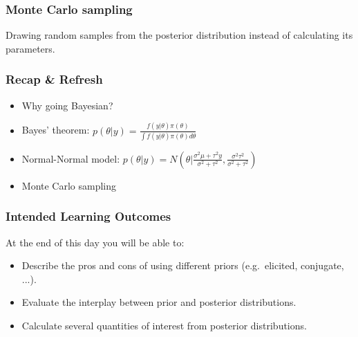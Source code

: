 \documentclass{beamer}
\newcommand{\1}{\ensuremath{\mathbf{1}}}
\begin{document}
%
%
%
\begin{frame}\frametitle{Monte Carlo sampling}
	Drawing random samples from the posterior distribution instead of calculating its parameters.
	\begin{center}
	\end{center}
\end{frame}
%
%
%
\begin{frame}\frametitle{Recap \& Refresh}
	\begin{itemize}
		\item Why going Bayesian? %
		\item Bayes' theorem: $p(\theta|y) = \frac{f(y|\theta)\pi(\theta)}{\int f(y|\theta)\pi(\theta)d\theta}$
		\item Normal-Normal model: $p(\theta|y) = N( \theta | \frac{\sigma^2\mu + \tau^2 y}{\sigma^2 + \tau^2}, \frac{\sigma^2\tau^2}{\sigma^2 + \tau^2})$
		\item Monte Carlo sampling
	\end{itemize}
\end{frame}
%
%
%
\begin{frame}\frametitle{Intended Learning Outcomes}
	At the end of this day you will be able to:
	\begin{itemize}
		\item Describe the pros and cons of using different priors (e.g.\ elicited, conjugate, ...).
		\item Evaluate the interplay between prior and posterior distributions.
		\item Calculate several quantities of interest from posterior distributions.
	\end{itemize}
\end{frame}
\end{document}
